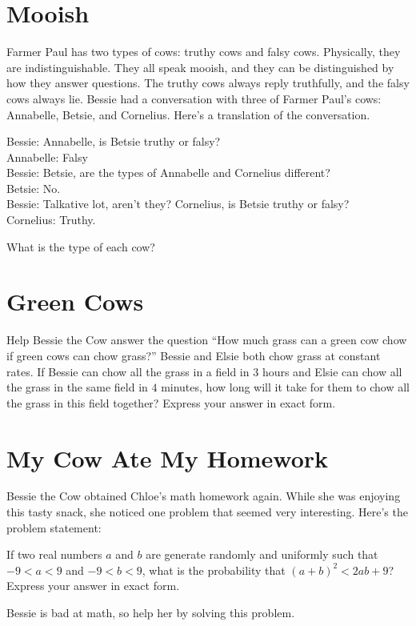 \documentclass{article}
\begin{document}
\section*{Mooish}
Farmer Paul has two types of cows: truthy cows and falsy cows.
Physically, they are indistinguishable.
They all speak mooish, and they can be distinguished by how they answer questions.
The truthy cows always reply truthfully, and the falsy cows always lie.
Bessie had a conversation with three of Farmer Paul's cows: Annabelle, Betsie, and Cornelius.
Here's a translation of the conversation.
\begin{displayquote}
	Bessie: Annabelle, is Betsie truthy or falsy? \\
	Annabelle: Falsy \\
	Bessie: Betsie, are the types of Annabelle and Cornelius different? \\
	Betsie: No. \\
	Bessie: Talkative lot, aren't they? Cornelius, is Betsie truthy or falsy? \\
	Cornelius: Truthy.
\end{displayquote}
What is the type of each cow?

\section*{Green Cows}
Help Bessie the Cow answer the question ``How much grass can a green cow chow if green cows can chow grass?''
Bessie and Elsie both chow grass at constant rates.
If Bessie can chow all the grass in a field in $3$ hours and Elsie can chow all the grass in the same field in $4$ minutes, how long will it take for them to chow all the grass in this field together?
Express your answer in exact form.

\section*{My Cow Ate My Homework}
Bessie the Cow obtained Chloe's math homework again.
While she was enjoying this tasty snack, she noticed one problem that seemed very interesting.
Here's the problem statement:
\begin{displayquote}
	If two real numbers $a$ and $b$ are generate randomly and uniformly such that $-9 < a < 9$ and $-9 < b < 9$, what is the probability that $(a + b)^2 < 2ab + 9$?
	Express your answer in exact form.
\end{displayquote}
Bessie is bad at math, so help her by solving this problem.
\end{document}
